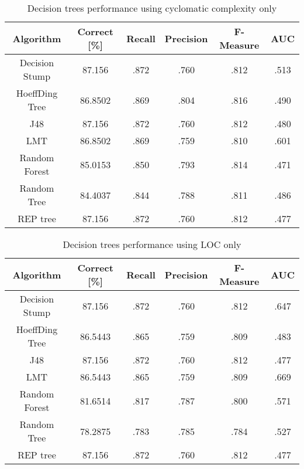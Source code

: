 \begin{table}[h!]
\centering
\begin{tabular}{ |c|c|c|c|c|c| } 
 \hline
 \textbf{Algorithm} & \textbf{Correct [\%]} &  \textbf{Recall} & \textbf{Precision} & \textbf{F-Measure} & \textbf{AUC}  \\ 
 \hline
 Decision Stump & \textcolor{myRed}{87.156} & \textcolor{myRed}{.872} & .760 & .812 & .513    \\ 
 \hline
 HoeffDing Tree & 86.8502 & .869 & \textcolor{myRed}{.804} & \textcolor{myRed}{.816} & .490   \\ 
 \hline
  J48 & \textcolor{myRed}{87.156} & \textcolor{myRed}{.872} & .760 & .812 & .480\\ 
 \hline
  LMT & 86.8502 & .869 & .759 & .810 & \textcolor{myRed}{.601}  \\ 
 \hline
  Random Forest & 85.0153 & .850 & .793 & .814 & .471 \\ 
 \hline
  Random Tree & 84.4037 & .844 & .788 & .811 & .486 \\ 
 \hline
 REP tree  & \textcolor{myRed}{87.156} & \textcolor{myRed}{.872} & .760 & .812 & .477 \\ 
 \hline
\end{tabular}
\caption{Decision trees performance using cyclomatic complexity only}
\label{table:DT_complexity}
\end{table}


\begin{table}[h!]
\centering
\begin{tabular}{ |c|c|c|c|c|c| } 
 \hline
 \textbf{Algorithm} & \textbf{Correct [\%]} &  \textbf{Recall} & \textbf{Precision} & \textbf{F-Measure} & \textbf{AUC}  \\ 
 \hline
 Decision Stump & \textcolor{myRed}{87.156}& \textcolor{myRed}{.872} & .760 & .812 & .647    \\ 
 \hline
 HoeffDing Tree & 86.5443 & .865 & .759 & .809 & .483   \\ 
 \hline
  J48 & \textcolor{myRed}{87.156} & \textcolor{myRed}{.872} & .760 & \textcolor{myRed}{.812} & .477\\ 
 \hline
  LMT & 86.5443 & .865 & .759 & .809 & \textcolor{myRed}{.669}  \\ 
 \hline
  Random Forest & 81.6514 & .817 & \textcolor{myRed}{.787} & .800 & .571 \\ 
 \hline
  Random Tree & 78.2875 & .783 & .785 & .784 & .527 \\ 
 \hline
 REP tree  & \textcolor{myRed}{87.156} & \textcolor{myRed}{.872} & .760 & .812 & .477 \\ 
 \hline

\end{tabular}
\caption{Decision trees performance using LOC only}
\label{table:DT_LOC}
\end{table}